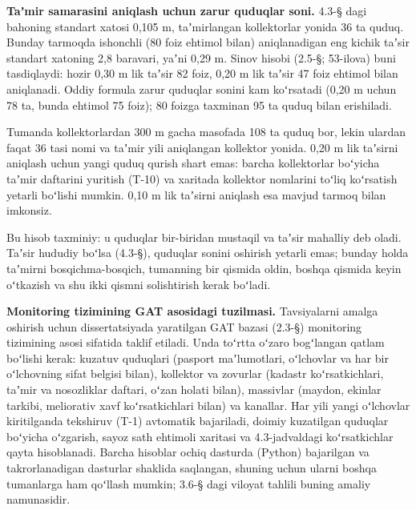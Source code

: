 

\textbf{Taʼmir samarasini aniqlash uchun zarur quduqlar soni.} 4.3-§
dagi bahoning standart xatosi 0,105 m, taʼmirlangan kollektorlar yonida
36 ta quduq. Bunday tarmoqda ishonchli (80 foiz ehtimol bilan)
aniqlanadigan eng kichik taʼsir standart xatoning 2,8 baravari, yaʼni
0,29 m. Sinov hisobi (2.5-§; 53-ilova) buni tasdiqlaydi: hozir 0,30 m
lik taʼsir 82 foiz, 0,20 m lik taʼsir 47 foiz ehtimol bilan aniqlanadi.
Oddiy formula zarur quduqlar sonini kam koʻrsatadi (0,20 m uchun 78 ta,
bunda ehtimol 75 foiz); 80 foizga taxminan 95 ta quduq bilan erishiladi.

Tumanda kollektorlardan 300 m gacha masofada 108 ta quduq bor, lekin
ulardan faqat 36 tasi nomi va taʼmir yili aniqlangan kollektor yonida.
0,20 m lik taʼsirni aniqlash uchun yangi quduq qurish shart emas: barcha
kollektorlar boʻyicha taʼmir daftarini yuritish (T-10) va xaritada
kollektor nomlarini toʻliq koʻrsatish yetarli boʻlishi mumkin. 0,10 m
lik taʼsirni aniqlash esa mavjud tarmoq bilan imkonsiz.

Bu hisob taxminiy: u quduqlar bir-biridan mustaqil va taʼsir mahalliy
deb oladi. Taʼsir hududiy boʻlsa (4.3-§), quduqlar sonini oshirish
yetarli emas; bunday holda taʼmirni bosqichma-bosqich, tumanning bir
qismida oldin, boshqa qismida keyin oʻtkazish va shu ikki qismni
solishtirish kerak boʻladi.

\textbf{Monitoring tizimining GAT asosidagi tuzilmasi.} Tavsiyalarni
amalga oshirish uchun dissertatsiyada yaratilgan GAT bazasi (2.3-§)
monitoring tizimining asosi sifatida taklif etiladi. Unda toʻrtta oʻzaro
bogʻlangan qatlam boʻlishi kerak: kuzatuv quduqlari (pasport
maʼlumotlari, oʻlchovlar va har bir oʻlchovning sifat belgisi bilan),
kollektor va zovurlar (kadastr koʻrsatkichlari, taʼmir va nosozliklar
daftari, oʻzan holati bilan), massivlar (maydon, ekinlar tarkibi,
meliorativ xavf koʻrsatkichlari bilan) va kanallar. Har yili yangi
oʻlchovlar kiritilganda tekshiruv (T-1) avtomatik bajariladi, doimiy
kuzatilgan quduqlar boʻyicha oʻzgarish, sayoz sath ehtimoli xaritasi va
4.3-jadvaldagi koʻrsatkichlar qayta hisoblanadi. Barcha hisoblar ochiq
dasturda (Python) bajarilgan va takrorlanadigan dasturlar shaklida
saqlangan, shuning uchun ularni boshqa tumanlarga ham qoʻllash mumkin;
3.6-§ dagi viloyat tahlili buning amaliy namunasidir.


